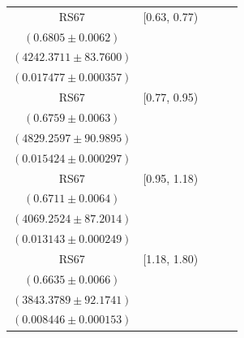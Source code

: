 {\begin{longtable}{|c|c|c|c|c|}
RS67 & [0.63, 0.77) & \begin{tabular}{@{}c@{}}$0.7347 \pm 0.0045$ \\ $(0.6805 \pm 0.0062)$\end{tabular} & \begin{tabular}{@{}c@{}}$3853.3000 \pm 76.7429$ \\ $(4242.3711 \pm 83.7600)$\end{tabular} & \begin{tabular}{@{}c@{}}$0.016834 \pm 0.000354$ \\ $(0.017477 \pm 0.000357)$\end{tabular} \\ \hline
RS67 & [0.77, 0.95) & \begin{tabular}{@{}c@{}}$0.7287 \pm 0.0045$ \\ $(0.6759 \pm 0.0063)$\end{tabular} & \begin{tabular}{@{}c@{}}$4398.3809 \pm 83.4655$ \\ $(4829.2597 \pm 90.9895)$\end{tabular} & \begin{tabular}{@{}c@{}}$0.015321 \pm 0.000296$ \\ $(0.015424 \pm 0.000297)$\end{tabular} \\ \hline
RS67 & [0.95, 1.18) & \begin{tabular}{@{}c@{}}$0.7229 \pm 0.0047$ \\ $(0.6711 \pm 0.0064)$\end{tabular} & \begin{tabular}{@{}c@{}}$3719.5086 \pm 80.3108$ \\ $(4069.2524 \pm 87.2014)$\end{tabular} & \begin{tabular}{@{}c@{}}$0.013341 \pm 0.000255$ \\ $(0.013143 \pm 0.000249)$\end{tabular} \\ \hline
RS67 & [1.18, 1.80) & \begin{tabular}{@{}c@{}}$0.7129 \pm 0.0053$ \\ $(0.6635 \pm 0.0066)$\end{tabular} & \begin{tabular}{@{}c@{}}$3509.4895 \pm 85.0441$ \\ $(3843.3789 \pm 92.1741)$\end{tabular} & \begin{tabular}{@{}c@{}}$0.009213 \pm 0.000160$ \\ $(0.008446 \pm 0.000153)$\end{tabular} \\ \hline
\end{longtable}
}
